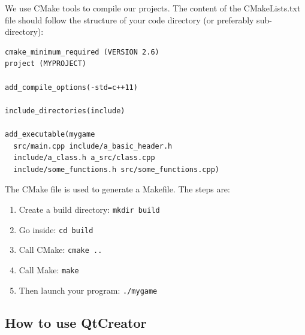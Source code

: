 \documentclass{ecnreport}
\begin{document}
We use CMake tools to compile our projects.
The content of the CMakeLists.txt file should follow the structure of your code directory (or preferably sub-directory):
\begin{center}
\begin{minipage}{.4\linewidth}
\end{minipage}
\begin{minipage}{.55\linewidth}\pythonstyle
\begin{lstlisting}
cmake_minimum_required (VERSION 2.6)
project (MYPROJECT)

add_compile_options(-std=c++11)

include_directories(include)

add_executable(mygame 
  src/main.cpp include/a_basic_header.h
  include/a_class.h a_src/class.cpp
  include/some_functions.h src/some_functions.cpp)
\end{lstlisting} \end{minipage}
\end{center}

The CMake file is used to generate a Makefile. The steps are:
\begin{enumerate}
 \item Create a build directory: \texttt{mkdir build}
 \item Go inside: \texttt{cd build}
 \item Call CMake: \texttt{cmake ..}
 \item Call Make: \texttt{make}
 \item Then launch your program: \texttt{./mygame}
\end{enumerate}

\subsection{How to use QtCreator}
\end{document}
